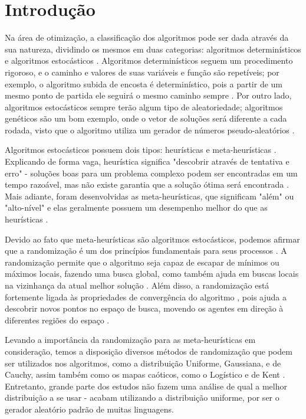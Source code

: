\chapter{Introdução}
\label{cap:introducao}

Na área de otimização, a classificação dos algoritmos pode ser dada através da sua natureza, dividindo os mesmos em duas categorias: algoritmos determinísticos e algoritmos estocásticos \cite{yang}. Algoritmos determinísticos seguem um procedimento rigoroso, e o caminho e valores de suas variáveis e função são repetíveis; por exemplo, o algoritmo subida de encosta é determinístico, pois a partir de um mesmo ponto de partida ele seguirá o mesmo caminho sempre \cite{yang}. Por outro lado, algoritmos estocásticos sempre terão algum tipo de aleatoriedade; algoritmos genéticos são um bom exemplo, onde o vetor de soluções será diferente a cada rodada, visto que o algoritmo utiliza um gerador de números pseudo-aleatórios \cite{yang}.

Algoritmos estocásticos possuem dois tipos: heurísticas e meta-heurísticas \cite{yang}. Explicando de forma vaga, heurística significa "descobrir através de tentativa e erro" \- - soluções boas para um problema complexo podem ser encontradas em um tempo razoável, mas não existe garantia que a solução ótima será encontrada \cite{yang}. Mais adiante, foram desenvolvidas as meta-heurísticas, que significam "além" ou "alto-nível" e elas geralmente possuem um desempenho melhor do que as heurísticas \cite{yang}.

Devido ao fato que meta-heurísticas são algoritmos estocásticos, podemos afirmar que a randomização é um dos princípios fundamentais para seus processos \cite{yang2}. A randomização permite que o algoritmo seja capaz de escapar de mínimos ou máximos locais, fazendo uma busca global, como também ajuda em buscas locais na vizinhança da atual melhor solução \cite{yang2}. Além disso, a randomização está fortemente ligada às propriedades de convergência do algoritmo \cite{caponetto}, pois ajuda a descobrir novos pontos no espaço de busca, movendo os agentes em direção à diferentes regiões do espaço \cite{fister}.

Levando a importância da randomização para as meta-heurísticas em consideração, temos a disposição diversos métodos de randomização que podem ser utilizados nos algoritmos, como a distribuição Uniforme, Gaussiana, e de Cauchy, assim também como os mapas caóticos, como o Logístico e de Kent \cite{fister}. Entretanto, grande parte dos estudos não fazem uma análise de qual a melhor distribuição a se usar - acabam utilizando a distribuição uniforme, por ser o gerador aleatório padrão de muitas linguagens.

